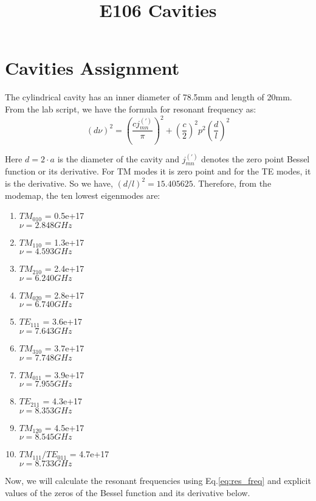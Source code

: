 \documentclass[a4paper]{article}
\begin{document}
\title{E106 Cavities}
\maketitle 
	\section{Cavities Assignment}
	The cylindrical cavity has an inner diameter of 78.5mm and length of 20mm. From the lab script, we have the formula for resonant frequency as:
	\begin{equation}
			(d \nu)^2 = \left(\frac{cj^{(')}_{mn} }{\pi }\right)^2 + \left(\frac{c}{2}\right)^2 p^2 \left(\frac{d}{l}\right)^2 
			\label{eq:res_freq}
	\end{equation}
	
	Here $d = 2\cdot a$ is the diameter of the cavity and $j^{(')}_{mn}$ denotes the zero point Bessel function or its derivative. For TM modes it is zero point and for the TE modes, it is the derivative. 
	So we have, $\left(d/l\right)^2 = 15.405625$. Therefore, from the modemap, the ten lowest eigenmodes are:
	\begin{enumerate}
			\item $TM_{010} $ = 0.5e+17 \\ 
					$\nu = 2.848 GHz$ 
			\item $TM_{110} $ = 1.3e+17 \\ 
					$\nu = 4.593 GHz$ 
			\item $TM_{210} $ = 2.4e+17 \\ 
					$ \nu = 6.240 GHz$ 
			\item $TM_{020} $ = 2.8e+17 \\
					$\nu = 6.740 GHz$ 
			\item $TE_{111} $ = 3.6e+17 \\ 
					$\nu = 7.643 GHz$ 
			\item $TM_{310} $ = 3.7e+17 \\
					$\nu = 7.748 GHz$ 
			\item $TM_{011} $ = 3.9e+17 \\
					$\nu = 7.955 GHz$ 
			\item $TE_{211} $ = 4.3e+17 \\
					$\nu = 8.353 GHz$ 
			\item $TM_{120} $ = 4.5e+17 \\
					$\nu = 8.545 GHz$ 
			\item $TM_{111}/TE_{011}  $ = 4.7e+17 \\
					$\nu = 8.733 GHz$ 
	\end{enumerate}
	Now, we will calculate the resonant frequencies using Eq.\ref{eq:res_freq} and explicit values of the zeros of the Bessel function and its derivative below.

\end{document}
